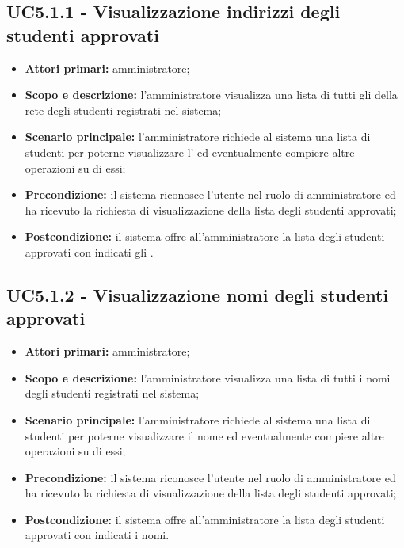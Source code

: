 \documentclass[AnalisiDeiRequisiti.tex]{subfiles}
\begin{document}
\subsection{UC5.1.1 - Visualizzazione indirizzi degli studenti approvati}
\begin{itemize}
	\item \textbf{Attori primari:} amministratore;
	\item \textbf{Scopo e descrizione:} l'amministratore visualizza una lista di tutti gli  della rete  degli studenti registrati nel sistema;
	\item \textbf{Scenario principale:} l'amministratore richiede al sistema una lista di studenti per poterne visualizzare l' ed eventualmente compiere altre operazioni su di essi;
	\item \textbf{Precondizione:} il sistema riconosce l'utente nel ruolo di amministratore ed ha ricevuto la richiesta di visualizzazione della lista degli studenti approvati;
	\item \textbf{Postcondizione:} il sistema offre all'amministratore la lista degli studenti approvati con indicati gli .
\end{itemize}
\subsection{UC5.1.2 - Visualizzazione nomi degli studenti approvati}
\begin{itemize}
	\item \textbf{Attori primari:} amministratore;
	\item \textbf{Scopo e descrizione:} l'amministratore visualizza una lista di tutti i nomi degli studenti registrati nel sistema;
	\item \textbf{Scenario principale:} l'amministratore richiede al sistema una lista di studenti per poterne visualizzare il nome ed eventualmente compiere altre operazioni su di essi;
	\item \textbf{Precondizione:} il sistema riconosce l'utente nel ruolo di amministratore ed ha ricevuto la richiesta di visualizzazione della lista degli studenti approvati;
	\item \textbf{Postcondizione:} il sistema offre all'amministratore la lista degli studenti approvati con indicati i nomi.
\end{itemize}
\end{document}
